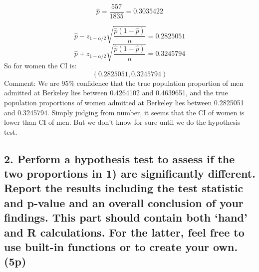 \documentclass[]{article}
\begin{document}
\[
\hat{p}=\frac{557}{1835}=0.3035422
\]

\[
\hat{p} - z_{1-\alpha/2}\sqrt{\frac{\hat{p}(1-\hat{p})}{n}}=0.2825051
\] \[
\hat{p} + z_{1-\alpha/2}\sqrt{\frac{\hat{p}(1-\hat{p})}{n}}=0.3245794
\] So for women the CI is: \[
(0.2825051,0.3245794)
\] Comment: We are 95\% confidence that the true population proportion
of men admitted at Berkeley lies between 0.4264102 and 0.4639651, and
the true population proportions of women admitted at Berkeley lies
between 0.2825051 and 0.3245794. Simply judging from number, it seems
that the CI of women is lower than CI of men. But we don't know for sure
until we do the hypothesis test.

\subsection{\texorpdfstring{2. Perform a hypothesis test to assess if
the two proportions in 1) are significantly different. Report the
results including the test statistic and p-value and an overall
conclusion of your findings. This part should contain both `hand' and R
calculations. For the latter, feel free to use built-in functions or to
create your own.
(5p)}{2. Perform a hypothesis test to assess if the two proportions in 1) are significantly different. Report the results including the test statistic and p-value and an overall conclusion of your findings. This part should contain both hand and R calculations. For the latter, feel free to use built-in functions or to create your own. (5p)}}\label{perform-a-hypothesis-test-to-assess-if-the-two-proportions-in-1-are-significantly-different.-report-the-results-including-the-test-statistic-and-p-value-and-an-overall-conclusion-of-your-findings.-this-part-should-contain-both-hand-and-r-calculations.-for-the-latter-feel-free-to-use-built-in-functions-or-to-create-your-own.-5p}
\end{document}
